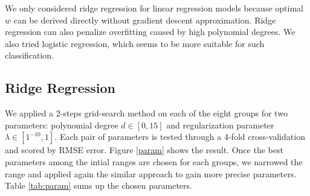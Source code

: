 \documentclass[10pt,conference,compsocconf]{IEEEtran}
\begin{document}



%


We only considered ridge regression for linear regression models because optimal $w$ can be derived directly without gradient descent approximation. Ridge regression can also penalize overfitting caused by high polynomial degrees. We also tried logistic regression, which seems to be more suitable for such classification.

\subsection{Ridge Regression}
We applied a 2-steps grid-search method on each of the eight groups for two parameters: polynomial degree $d \in [0, 15]$ and regularization parameter $\lambda \in [1^{-10}, 1]$.  Each pair of parameters is tested through a 4-fold cross-validation and scored by RMSE error. Figure \ref{param} shows the result. Once the best parameters among the intial ranges are chosen for each groups, we narrowed the range and applied again the similar approach to gain more precise parameters. Table \ref{tab:param} sums up the chosen parameters.
\end{document}
